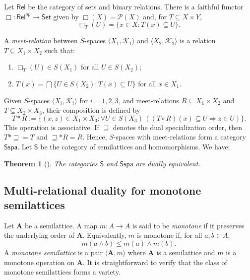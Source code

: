 \documentclass{article}
\newtheorem{theorem}{\bf Theorem}[section]
\begin{document}
\medskip

Let $\mathsf{Rel}$ be the category of sets and binary relations. There is a faithful functor $\Box \colon \mathsf{Rel}^{op} \to \mathsf{Set}$ given by $\Box(X)=\mathcal{P}(X)$ and, for $T \subseteq X \times Y$,
\[
\Box_T(U) = \{x \in X : T(x) \subseteq U\}.
\]

A \emph{meet-relation} between $S$-spaces $\langle X_1,\mathcal{K}_1\rangle$ and $\langle X_2,\mathcal{K}_2\rangle$ is a relation $T \subseteq X_1 \times X_2$ such that:
\begin{enumerate}
    \item $\Box_T(U) \in S(X_1)$ for all $U \in S(X_2)$;
    \item $T(x) = \displaystyle \bigcap \{U \in S(X_2) : T(x) \subseteq U\}$ for all $x \in X_1$.
\end{enumerate}

Given $S$-spaces $\langle X_i,\mathcal{K}_i\rangle$ for $i=1,2,3$, and meet-relations $R \subseteq X_1 \times X_2$ and $T \subseteq X_2 \times X_3$, their composition is defined by
\begin{equation}\label{Definicion composition meet-relations}
T \ast R := \{(x,z) \in X_1 \times X_3 : \forall U \in S(X_3)\, ((T \circ R)(x) \subseteq U \Rightarrow z \in U)\}.
\end{equation}
This operation is associative. If $\sqsupseteq$ denotes the dual specialization order, then $T \ast \sqsupseteq = T$ and $\sqsupseteq \ast R = R$. Hence, $S$-spaces with meet-relations form a category $\mathsf{Sspa}$. Let $\mathsf{S}$ be the category of semilattices and homomorphisms. We have:

\begin{theorem}[\cite{CG}]\label{theo: dualidad semireticulos}
The categories $\mathsf{S}$ and $\mathsf{Sspa}$ are dually equivalent.
\end{theorem}

\subsection{Multi-relational duality for monotone semilattices}

Let $\mathbf{A}$ be a semilattice. A map $m \colon A \to A$ is said to be \emph{monotone} if it preserves the underlying order of $\mathbf{A}$. Equivalently, $m$ is monotone if, for all $a,b \in A$,
\[
m(a \wedge b) \leq m(a) \wedge m(b).
\]
A \emph{monotone semilattice} is a pair $\langle\mathbf{A}, m\rangle$ where $\mathbf{A}$ is a semilattice and $m$ is a monotone operation on $\mathbf{A}$. It is straightforward to verify that the class of monotone semilattices forms a variety.
\end{document}
